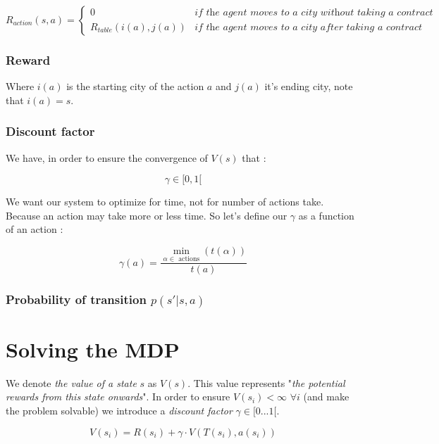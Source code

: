 \documentclass[11pt]{article}
\begin{document}
\[R_{action}(s,a) = \begin{cases}
    0               & \textit{if the agent moves to a city without taking a contract} \\
    R_{table}(i(a),j(a))    & \textit{if the agent moves to a city after taking a contract}
\end{cases}\]

\subsubsection{Reward}

Where  $i(a)$ is the starting city of the action $a$ and $j(a)$ it's ending city, note that $i(a) = s$.

\subsubsection{Discount factor}

We have, in order to ensure the convergence of $V(s)$ that :

\[ \gamma \in [0,1[ \]

We want our system to optimize for time, not for number of actions take. Because an action may take more or less time. So let's define our $\gamma$ as a function of an action :

\[\gamma (a) = \frac{ \underset{\alpha \in \text{ actions}}{\min} (t(\alpha))}{t(a)}\]


\subsubsection{Probability of transition $p(s'|s,a)$}


\newpage

\section{Solving the MDP}

We denote \textit{the value of a state} $s$ as $V(s)$. This value represents "\textit{the potential rewards from this state onwards}". In order to ensure $V(s_i) < \infty$ $\forall i$ (and make the problem solvable) we introduce a \textit{discount factor} $\gamma \in [0 ... 1 [$.

\[V(s_i) = R(s_i) + \gamma \cdot V(T(s_i),a(s_i))\]
\end{document}
